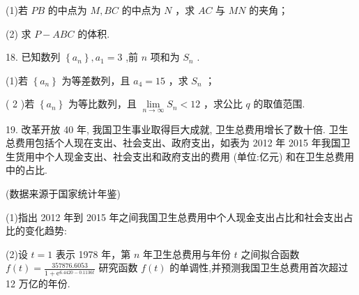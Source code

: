 \documentclass[10pt]{article}
\begin{document}
(1)若 \({PB}\) 的中点为 \(M,{BC}\) 的中点为 \(N\) ，求 \({AC}\) 与 \({MN}\) 的夹角；

(2) 求 \(P - {ABC}\) 的体积.

18. 已知数列 \(\left\{  {a}_{n}\right\}  ,{a}_{1} = 3\) ,前 \(n\) 项和为 \({S}_{n}\) .

(1)若 \(\left\{  {a}_{n}\right\}\) 为等差数列，且 \({a}_{4} = {15}\) ，求 \({S}_{n}\) ；

( 2 )若 \(\left\{  {a}_{n}\right\}\) 为等比数列，且 \(\mathop{\lim }\limits_{{n \rightarrow  \infty }}{S}_{n} < {12}\) ，求公比 \(q\) 的取值范围.

19. 改革开放 40 年, 我国卫生事业取得巨大成就, 卫生总费用增长了数十倍. 卫生总费用包括个人现在支出、社会支出、政府支出，如表为 2012 年 2015 年我国卫生货用中个人现金支出、社会支出和政府支出的费用 (单位:亿元) 和在卫生总费用中的占比.

\begin{center}
\end{center}

(数据来源于国家统计年鉴)

(1)指出 2012 年到 2015 年之间我国卫生总费用中个人现金支出占比和社会支出占比的变化趋势:

(2)设 \(t = 1\) 表示 1978 年，第 \(n\) 年卫生总费用与年份 \(t\) 之间拟合函数 \(f\left( t\right)  = \frac{357876.6053}{1 + {\mathrm{e}}^{{6.4420} - {0.1136t}}}\) 研究函数 \(f\left( t\right)\) 的单调性,并预测我国卫生总费用首次超过 12 万亿的年份.
\end{document}
